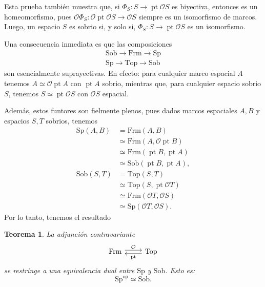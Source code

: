 \documentclass[12pt,letterpaper,titlepage]{article}
\newtheorem{thm}{Teorema}
\theoremstyle{definition}
\renewcommand\cal[1]{\mathcal{#1}}
\newcommand\<{\langle}
\renewcommand\>{\rangle}
\newcommand{\Frm}{\mathrm{Frm}}
\newcommand{\Top}{\mathrm{Top}}
\newcommand{\Sp}{\mathrm{Sp}}
\newcommand{\Sob}{\mathrm{Sob}}
\newcommand{\op}{\mathrm{op}}
\DeclareMathOperator{\pt}{pt}
\begin{document}
Esta prueba también muestra que, si $\Phi_S:S\to\pt\cal OS$
es biyectiva, entonces es un homeomorfismo,
pues $\cal O\Phi_S:\cal O\pt\cal OS\to\cal OS$
siempre es un isomorfismo de marcos.
Luego, un espacio $S$ es sobrio si, y solo si,
$\Phi_S:S\to\pt\cal OS$ es un isomorfismo.

Una consecuencia inmediata es que las composiciones
\begin{align*}
    \Sob \to \Frm \to \Sp \\
    \Sp \to \Top \to \Sob
\end{align*}
son esencialmente suprayectivas.
En efecto: para cualquier marco espacial $A$ tenemos
$A\simeq\cal O\pt A$ con $\pt A$ sobrio, mientras que,
para cualquier espacio sobrio $S$, tenemos $S\simeq\pt\cal OS$
con $\cal OS$ espacial.

Además, estos funtores son fielmente plenos, pues dados marcos
espaciales $A,B$ y espacios $S,T$ sobrios, tenemos
\begin{align*}
    \Sp(A,B)
    &= \Frm(A,B) \\
    &\simeq \Frm(A,\cal O\pt B) \\
    &\simeq \Frm(\pt B,\pt A) \\
    &\simeq \Sob(\pt B,\pt A),
    \\
    \Sob(S,T)
    &= \Top(S,T) \\
    &\simeq \Top(S,\pt\cal OT) \\
    &\simeq \Frm(\cal OT,\cal OS) \\
    &\simeq \Sp(\cal OT,\cal OS).
\end{align*}
Por lo tanto, tenemos el resultado
\begin{thm}
    La adjunción contravariante
    \[
        \begin{tikzcd}
            \Frm \ar[r,"\cal O",shift left]
            & \Top \ar[l,"\pt",shift left]
        \end{tikzcd}
    \]
    se restringe a una equivalencia dual entre $\Sp$ y $\Sob$.
    Esto es:
    \[
        \Sp^\op \simeq \Sob.
    \]
\end{thm}
\end{document}
